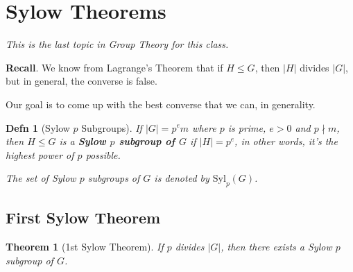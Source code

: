 \documentclass[12pt]{article}
\def\Syl{\text{Syl}}
\newtheorem{theorem}{Theorem}
\newtheorem{definition}{Defn}
\theoremstyle{remark}
\theoremstyle{remark}
\theoremstyle{remark}
\theoremstyle{remark}
\theoremstyle{remark}
\begin{document}
\section{Sylow Theorems}

{\it This is the last topic in Group Theory for this class.}

{\bf Recall}. We know from Lagrange's Theorem that if $H \le G$, then $|H|$
divides $|G|$, but in general, the converse is false.

Our goal is to come up with the best converse that we can, in generality.

\begin{definition}[Sylow $p$ Subgroups]
  If $|G| = p^e m$ where $p$ is prime, $e > 0$ and $p \nmid m$, then $H \le G$
  is a {\bf Sylow $p$ subgroup of $G$} if $|H| = p^e$, in other words, it's the
  highest power of $p$ possible.

  The set of Sylow $p$ subgroups of $G$ is denoted by $\Syl_p(G)$.
\end{definition}

\subsection{First Sylow Theorem}

\begin{theorem}[1st Sylow Theorem]
  If $p$ divides $|G|$, then there exists a Sylow $p$ subgroup of $G$.
\end{theorem}
\end{document}
